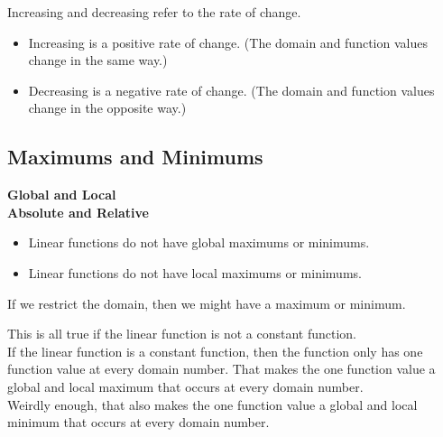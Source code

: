 \documentclass{ximera}
\begin{document}
Increasing and decreasing refer to the rate of change.


\begin{itemize}
\item Increasing is a positive rate of change. (The domain and function values change in the same way.)
\item Decreasing is a negative rate of change. (The domain and function values change in the opposite way.)
\end{itemize}
















\subsection*{Maximums and Minimums}

\textbf{\textcolor{blue!55!black}{Global and Local}} \\
\textbf{\textcolor{blue!55!black}{Absolute and Relative}} \\


\begin{itemize}
     \item Linear functions do not have global maximums or minimums. 
     \item Linear functions do not have local maximums or minimums. 
\end{itemize}


If we restrict the domain, then we might have a maximum or minimum. \\



\begin{warning}

This is all true if the linear function is not a constant function. \\


If the linear function is a constant function, then the function only has one function value at every domain number.  That makes the one function value a global and local maximum that occurs at every domain number. \\

Weirdly enough, that also makes the one function value a global and local minimum that occurs at every domain number.

\end{warning}
\end{document}
